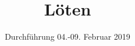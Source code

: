 

\subject{Versuchspraktikum}
\title{Löten}
\date{%
  Durchführung 04.-09. Februar 2019
}



\maketitle
\thispagestyle{empty}
\tableofcontents
\newpage






% 

\printbibliography{}


